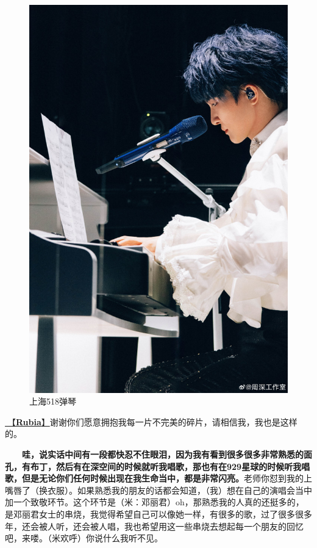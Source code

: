 \documentclass[]{ctexbook}
\begin{document}
\begin{figure}

{\centering \includegraphics[width=400pt]{img/shanghai20240518/002} 

}

\caption{上海518弹琴}\label{fig:unnamed-chunk-34}
\end{figure}

\hyperref[rubia]{🎵【\textbf{Rubia}】}谢谢你们愿意拥抱我每一片不完美的碎片，请相信我，我也是这样的。

  \textbf{哇，说实话中间有一段都快忍不住眼泪，因为我有看到很多很多非常熟悉的面孔，有布丁，然后有在深空间的时候就听我唱歌，那也有在929星球的时候听我唱歌，但是无论你们任何时候出现在我生命当中，都是非常闪亮。}老师你怼到我的上嘴唇了（换衣服）。如果熟悉我的朋友的话都会知道，（我）想在自己的演唱会当中加一个致敬环节。这个环节是（米：邓丽君）oh，那熟悉我的人真的还挺多的，是邓丽君女士的串烧，我觉得希望自己可以像她一样，有很多的歌，过了很多很多年，还会被人听，还会被人唱，我也希望用这一些串烧去想起每一个朋友的回忆吧，来喽。（米欢呼）你说什么我听不见。
\end{document}

